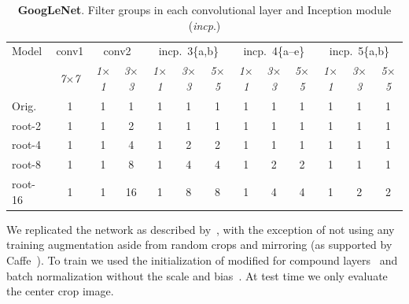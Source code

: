 \documentclass[thesis]{subfiles}
\begin{document}
	\begin{table}[tp]
		\caption[GoogLeNet root architectures.]{\textbf{GoogLeNet}. Filter groups in each convolutional layer and Inception module (\textit{incp}.)}
		\label{table:googlenetconfig}
		\centering
		\begin{tabular}{@{}lcccccccccccc@{}}
			\toprule
			Model & conv1 & \multicolumn{2}{c}{conv2} & \multicolumn{3}{c}{incp.~3\{a,b\}} & \multicolumn{3}{c}{incp.~4\{a--e\}} & \multicolumn{3}{c}{incp.~5\{a,b\}} \\
			& \textit{\footnotesize7$\times$7} & \textit{\footnotesize1$\times$1} & \textit{\footnotesize3$\times$3} & \textit{\footnotesize1$\times$1} & \textit{\footnotesize3$\times$3} & \textit{\footnotesize5$\times$5} & \textit{\footnotesize1$\times$1} & \textit{\footnotesize3$\times$3} & \textit{\footnotesize5$\times$5} & \textit{\footnotesize1$\times$1} & \textit{\footnotesize3$\times$3} & \textit{\footnotesize5$\times$5} \\
			Orig. & 1 &  1 &  1 & 1 & 1 & 1 & 1 & 1 & 1 & 1 & 1 & 1\\ 
			\midrule
			root-2 & 1 &  1 &  2 & 1 & 1 & 1 & 1 & 1 & 1 & 1 & 1 & 1\\
			root-4 & 1 &  1 &  4 & 1 & 2 & 2 & 1 & 1 & 1 & 1 & 1 & 1\\
			root-8 & 1 &  1 &  8 & 1 & 4 & 4 & 1 & 2 & 2 & 1 & 1 & 1\\
			root-16 & 1 &  1 & 16 & 1 & 8 & 8 & 1 & 4 & 4 & 1 & 2 & 2\\
			\bottomrule
		\end{tabular}
	\end{table}
	
	We replicated the network as described by~\citet{Szegedy2014going}, with the exception of not using any training augmentation aside from random crops and mirroring (as supported by Caffe~\cite{Jia2014}). To train we used the initialization of \citep{He2015b} modified for compound layers~\citep{Ioannou2016} and batch normalization without the scale and bias~\citep{Ioffe2015}. At test time we only evaluate the center crop image.
	
\end{document}
